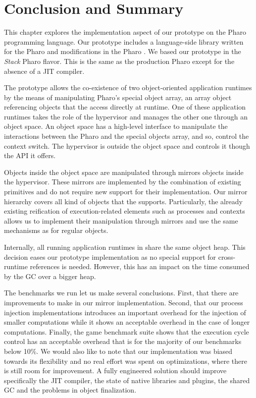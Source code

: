 \section{Conclusion and Summary}

This chapter explores the implementation aspect of our \Vtt prototype on the Pharo programming language. Our prototype includes a language-side library written for the Pharo and modifications in the Pharo \VM. We based our prototype in the \emph{Stack} Pharo \VM flavor. This \VM is the same as the production Pharo \VM except for the absence of a JIT compiler.

The \Vtt prototype allows the co-existence of two object-oriented application runtimes by the means of manipulating Pharo's special object array, an array object referencing objects that the \VM access directly at runtime. One of these application runtimes takes the role of the hypervisor and manages the other one through an object space. An object space has a high-level interface to manipulate the interactions between the Pharo \VM and the special objects array, and so, control the context switch. The hypervisor is outside the object space and controls it though the API it offers.

Objects inside the object space are manipulated through mirrors objects inside the hypervisor. These mirrors are implemented by the combination of existing \VM primitives and do not require new \VM support for their implementation. Our mirror hierarchy covers all kind of objects that the \VM supports. Particularly, the already existing reification of execution-related elements such as processes and contexts allows us to implement their manipulation through mirrors and use the same mechanisms as for regular objects.

Internally, all running application runtimes in \Vtt share the same object heap. This decision eases our prototype implementation as no special support for cross-runtime references is needed. However, this has an impact on the time consumed by the GC over a bigger heap.

The benchmarks we run let us make several conclusions. First, that there are improvements to make in our mirror implementation. Second, that our process injection implementations introduces an important overhead for the injection of smaller computations while it shows an acceptable overhead in the case of longer computations. Finally, the game benchmark suite shows that the execution cycle control has an acceptable overhead that is for the majority of our benchmarks below 10\%. We would also like to note that our implementation was biased towards its flexibility and no real effort was spent on optimizations, where there is still room for improvement. A fully engineered solution should improve specifically the JIT compiler, the state of native libraries and plugins, the shared GC and the problems in object finalization.

